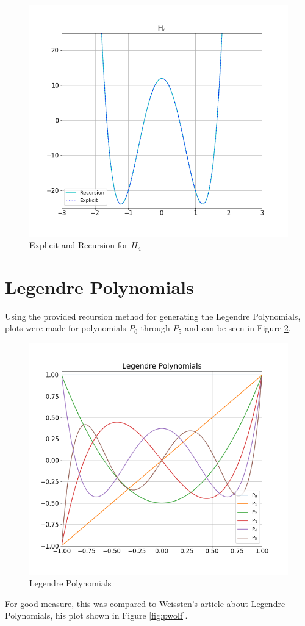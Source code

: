\documentclass[twocolumn]{article}
\begin{document}
\begin{figure}[]
  \centering
  \includegraphics[scale = 0.4]{h4}
  \caption{Explicit and Recursion for $H_4$}
  \label{fig:h4}
\end{figure}
\vfill\eject
\section{Legendre Polynomials}
Using the provided recursion method for generating the Legendre Polynomials, plots were made for polynomials $P_0$ through $P_5$ and can be seen in Figure \ref{fig:leg}.

\begin{figure}[h]
  \centering
  \includegraphics[scale = 0.4]{legendre}
  \caption{Legendre Polynomials}
  \label{fig:leg}
\end{figure}
For good measure, this was compared to Weissten's article about Legendre Polynomials, his plot shown in Figure \ref{fig:pwolf}.
\end{document}
